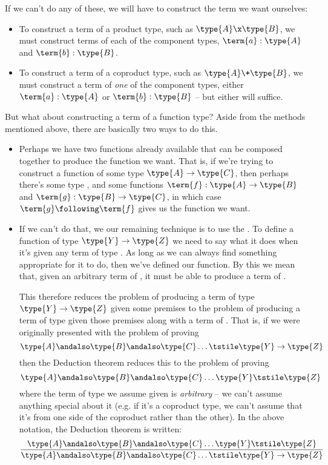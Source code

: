 If we can't do any of these, we will have to construct the term we want ourselves:
\begin{itemize}
\item To construct a term of a product type, such as $\type{A} \x \type{B}$, we must construct terms of each of the component types, $\term{a}:\type{A}$ and $\term{b}:\type{B}$.

\item To construct a term of a coproduct type, such as $\type{A} \+ \type{B}$, we must construct a term of \emph{one} of the component types, either $\term{a}:\type{A}$ or $\term{b}:\type{B}$ -- but either will suffice.
\end{itemize}

But what about constructing a term of a function type?  Aside from the methods mentioned above, there are basically two ways to do this.  
\begin{itemize}
\item Perhaps we have two functions already available that can be composed together to produce the function we want.  That is, if we're trying to construct a function of some type 
$\type{A} \to \type{C}$, then perhaps there's some type , and some functions 
$\term{f}:\type{A} \to \type{B}$ and
$\term{g}:\type{B} \to \type{C}$, in which case $\term{g} \following \term{f}$ gives us the function we want.
\item If we can't do that, we our remaining technique is to use the .  
To define a function of type 
$\type{Y} \to \type{Z}$ we need to say what it does when it's given any term of type .  As long as we can always find something appropriate for it to do, then we've defined our function.  By this we mean that, given an arbitrary term of , it must be able to produce a term of .  

This therefore reduces the problem of producing a term of type $\type{Y} \to \type{Z}$ given some premises to the problem of producing a term of type  given those premises along with a term of .
That is, if we were originally presented with the problem of proving
\[
\type{A}\andalso \type{B}\andalso \type{C} \ldots \tstile \type{Y} \to \type{Z}
\]
then the Deduction theorem reduces this to the problem of proving
\[
\type{A}\andalso \type{B}\andalso \type{C} \ldots \type{Y} \tstile \type{Z}
\]
where the term of type  we assume given is \emph{arbitrary} -- we can't assume anything special about it (e.g. if it's a coproduct type, we can't assume that it's from one side of the coproduct rather than the other).  In the above notation, the Deduction theorem is written:
\[
\frac
{\type{A}\andalso \type{B}\andalso \type{C} \ldots \type{Y} \tstile \type{Z}
}
{\type{A}\andalso \type{B}\andalso \type{C} \ldots \tstile \type{Y} \to \type{Z}
}
\]
\end{itemize}

